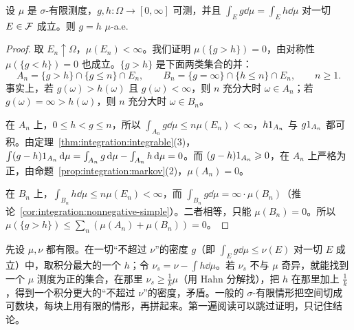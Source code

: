 \begin{lemma}[密度的唯一性]\label{lem:ac:density-unique}
设 $\mu$ 是 $\sigma$-有限测度，$g,h:\Omega\to[0,\infty]$ 可测，并且 $\int_Eg\dd\mu=\int_Eh\dd\mu$ 对一切 $E\in\mathcal{F}$ 成立。则 $g=h$ $\mu$-a.e.
\end{lemma}
\begin{proof}
取 $E_n\uparrow\Omega$，$\mu(E_n)<\infty$。我们证明 $\mu(\{g>h\})=0$，由对称性 $\mu(\{g<h\})=0$ 也成立。$\{g>h\}$ 是下面两类集合的并：
\[
A_n=\{g>h\}\cap\{g\leqslant n\}\cap E_n,\qquad B_n=\{g=\infty\}\cap\{h\leqslant n\}\cap E_n,\qquad n\geqslant1 .
\]
事实上，若 $g(\omega)>h(\omega)$ 且 $g(\omega)<\infty$，则 $n$ 充分大时 $\omega\in A_n$；若 $g(\omega)=\infty>h(\omega)$，则 $n$ 充分大时 $\omega\in B_n$。

在 $A_n$ 上，$0\leqslant h<g\leqslant n$，所以 $\int_{A_n}g\dd\mu\leqslant n\mu(E_n)<\infty$，$h1_{A_n}$ 与 $g1_{A_n}$ 都可积。由定理~\ref{thm:integration:integrable}(3)，$\int(g-h)1_{A_n}\,\mathrm{d}\mu=\int_{A_n}g\,\mathrm{d}\mu-\int_{A_n}h\,\mathrm{d}\mu=0$。而 $(g-h)1_{A_n}\geqslant0$，在 $A_n$ 上严格为正，由命题~\ref{prop:integration:markov}(2)，$\mu(A_n)=0$。

在 $B_n$ 上，$\int_{B_n}h\dd\mu\leqslant n\mu(E_n)<\infty$，而 $\int_{B_n}g\dd\mu=\infty\cdot\mu(B_n)$（推论~\ref{cor:integration:nonnegative-simple}）。二者相等，只能 $\mu(B_n)=0$。所以 $\mu(\{g>h\})\leqslant\sum_n(\mu(A_n)+\mu(B_n))=0$。
\end{proof}

\begin{remark}[证明思路]
先设 $\mu,\nu$ 都有限。在一切“不超过 $\nu$”的密度 $g$（即 $\int_Eg\dd\mu\leqslant\nu(E)$ 对一切 $E$ 成立）中，取积分最大的一个 $h$；令 $\nu_s=\nu-\int h\dd\mu$。若 $\nu_s$ 不与 $\mu$ 奇异，就能找到一个 $\mu$ 测度为正的集合，在那里 $\nu_s\geqslant\frac1k\mu$（用 Hahn 分解找），把 $h$ 在那里加上 $\frac1k$，得到一个积分更大的“不超过 $\nu$”的密度，矛盾。一般的 $\sigma$-有限情形把空间切成可数块，每块上用有限的情形，再拼起来。第一遍阅读可以跳过证明，只记住结论。
\end{remark}

